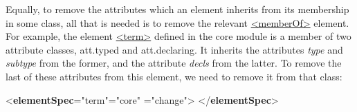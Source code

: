 Equally, to remove the attributes which an element inherits from its membership in some class, all that is needed is to remove the relevant \hyperref[TEI.memberOf]{<memberOf>} element. For example, the element \hyperref[TEI.term]{<term>} defined in the core module is a member of two attribute classes, \textsf{att.typed} and \textsf{att.declaring}. It inherits the attributes {\itshape type} and {\itshape subtype} from the former, and the attribute {\itshape decls} from the latter. To remove the last of these attributes from this element, we need to remove it from that class: \par\bgroup{}\exampleFont \begin{shaded}\noindent\mbox{}{<\textbf{elementSpec}\hspace*{1em}{ident}="{term}"\hspace*{1em}{module}="{core}"\mbox{}\newline 
\hspace*{1em}{mode}="{change}">}\mbox{}\newline 
{}\mbox{}\newline 
\hspace*{1em}\mbox{}\newline 
{}\mbox{}\newline 
{</\textbf{elementSpec}>}\end{shaded}\egroup\par \par
